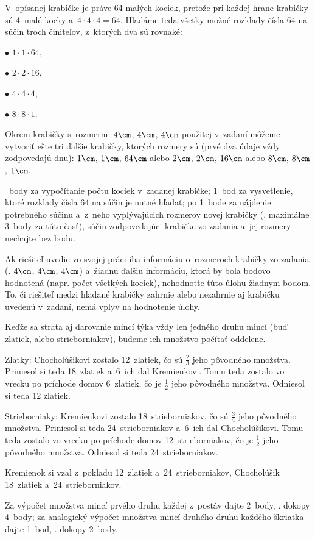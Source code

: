 {%
V~opísanej krabičke je práve 64 malých kociek, pretože pri každej hrane krabičky sú 4~malé kocky a~$4\cdot 4\cdot 4=64$.
Hľadáme teda všetky možné rozklady čísla $64$ na súčin troch činiteľov, z~ktorých
dva sú rovnaké:
  \item{$\bullet$} $1\cdot1\cdot64$,
  \item{$\bullet$} $2\cdot2\cdot16$,
  \item{$\bullet$} $4\cdot4\cdot4$,
  \item{$\bullet$} $8\cdot8\cdot1$.

Okrem krabičky s~rozmermi $4\cm$, $4\cm$, $4\cm$ použitej v~zadaní môžeme vytvoriť ešte tri ďalšie krabičky,
ktorých rozmery sú (prvé dva údaje vždy zodpovedajú dnu):
$1\cm$, $1\cm$, $64\cm$ alebo $2\cm$, $2\cm$, $16\cm$ alebo $8\cm$, $8\cm$, $1\cm$.

~body za vypočítanie počtu kociek v~zadanej krabičke;
1~bod za vysvetlenie, ktoré rozklady čísla $64$ na súčin je nutné hľadať;
po 1~bode za nájdenie potrebného súčinu a~z~neho vyplývajúcich rozmerov novej krabičky
(\tj. maximálne 3~body za túto časť),
súčin zodpovedajúci krabičke zo zadania a~jej rozmery nechajte bez bodu.

\poznamka
Ak riešiteľ uvedie vo svojej práci iba informáciu o~rozmeroch krabičky zo zadania
(\tj. $4\cm$, $4\cm$, $4\cm$) a~žiadnu ďalšiu informáciu, ktorá by bola bodovo
hodnotená (napr. počet všetkých kociek), nehodnoťte túto úlohu žiadnym
bodom.
To, či riešiteľ medzi hľadané krabičky zahrnie alebo nezahrnie aj krabičku uvedenú
v~zadaní, nemá vplyv na hodnotenie úlohy.
\endhodnotenie
}

{%
Keďže sa strata aj darovanie mincí týka vždy len jedného druhu mincí (buď
zlatiek, alebo strieborniakov), budeme ich množstvo počítať oddelene.

Zlatky:
Chocholúšikovi zostalo 12~zlatiek, čo sú $\frac23$ jeho pôvodného množstva.
Priniesol si teda 18~zlatiek a~6~ich dal Kremienkovi.
Tomu teda zostalo vo vrecku po príchode domov 6~zlatiek, čo je $\frac12$ jeho
pôvodného množstva.
Odniesol si teda 12 zlatiek.

Strieborniaky:
Kremienkovi zostalo 18~strieborniakov, čo sú $\frac34$ jeho pôvodného množstva.
Priniesol si teda 24~strieborniakov a~6~ich dal Chocholúšikovi.
Tomu teda zostalo vo vrecku po príchode domov 12~strieborniakov, čo je $\frac12$
jeho pôvodného množstva.
Odniesol si teda 24~strieborniakov.

Kremienok si vzal z~pokladu 12~zlatiek a~24~strieborniakov, Chocholúšik 18~zlatiek a~24~strieborniakov.

\hodnotenie
Za výpočet množstva mincí prvého druhu každej z~postáv dajte 2~body, \tj.
dokopy 4~body;
za analogický výpočet množstva mincí druhého druhu každého škriatka dajte 1~bod,
\tj. dokopy 2~body.
\endhodnotenie
}

